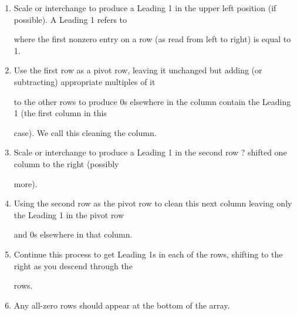 \documentclass[11pt,fleqn]{article}
\begin{document}
\begin{center}
\begin{tcolorbox}[title={\fontsize{13pt}{13pt}\selectfont Solving Linear Systems},enforce breakable, pad at break=4mm, colframe=darkcrimson!100,colback=black!1,width=.9\linewidth,sharp corners=north]
\begin{tcolorbox}[title={\fontsize{13pt}{13pt}\selectfont Strategy for getting to the reduced row-echelon form},enforce breakable, pad at break=4mm, colframe=crimsom!80,colback=black!1,width=.9\linewidth,sharp corners=north]\fontsize{11.5pt}{12pt}\selectfont
\begin{enumerate}

\item Scale or interchange to produce a Leading 1 in the upper left position (if possible). A Leading 1 refers to

where the first nonzero entry on a row (as read from left to right) is equal to 1.

\item Use the first row as a pivot row, leaving it unchanged but adding (or subtracting) appropriate multiples of it

to the other rows to produce 0s elsewhere in the column contain the Leading 1 (the first column in this

case). We call this cleaning the column.

\item Scale or interchange to produce a Leading 1 in the second row ? shifted one column to the right (possibly

more).

\item Using the second row as the pivot row to clean this next column leaving only the Leading 1 in the pivot row

and 0s elsewhere in that column.

\item Continue this process to get Leading 1s in each of the rows, shifting to the right as you descend through the

rows.

\item Any all-zero rows should appear at the bottom of the array.
\end{enumerate}
\end{tcolorbox}

\end{tcolorbox}

\end{center}
\end{document}
